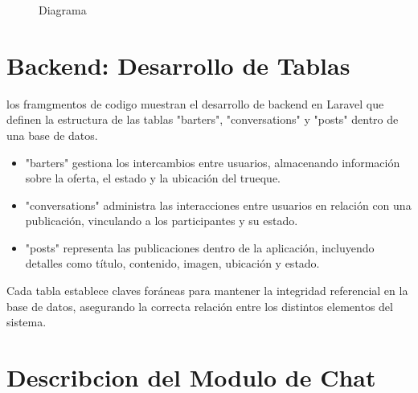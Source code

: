 \documentclass[11pt, a4paper, oneside]{book}
\begin{document}
\begin{itemize}
\begin{figure}[h!]
\caption{Diagrama} 

\label{fig:mi_imagen} 

\end{figure} 

 \vspace{3cm}

\section{Backend: Desarrollo de Tablas} 

los framgmentos de codigo  muestran el desarrollo de backend en Laravel que definen la estructura de las tablas "barters", "conversations" y "posts" dentro de una base de datos. 

\begin{itemize} 

    \item "barters" gestiona los intercambios entre usuarios, almacenando información sobre la oferta, el estado y la ubicación del trueque. 

\end{itemize} 

\begin{itemize} 

    \item "conversations" administra las interacciones entre usuarios en relación con una publicación, vinculando a los participantes y su estado. 

\end{itemize} 

 

\begin{itemize} 

    \item "posts" representa las publicaciones dentro de la aplicación, incluyendo detalles como título, contenido, imagen, ubicación y estado. 

 

\end{itemize} 

 

Cada tabla establece claves foráneas para mantener la integridad referencial en la base de datos, asegurando la correcta relación entre los distintos elementos del sistema. 


\end{itemize}


\section{Describcion del Modulo de Chat}
\end{document}
